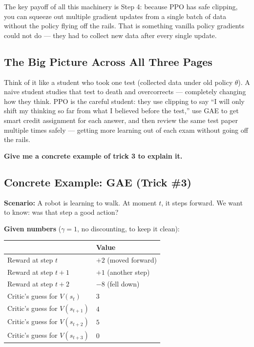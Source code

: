 The key payoff of all this machinery is Step 4: because PPO has safe clipping, you can squeeze out multiple gradient updates from a single batch of data without the policy flying off the rails. That is something vanilla policy gradients could not do --- they had to collect new data after every single update.

\subsection*{The Big Picture Across All Three Pages}

Think of it like a student who took one test (collected data under old policy $\theta$). A naive student studies that test to death and overcorrects --- completely changing how they think. PPO is the careful student: they use clipping to say ``I will only shift my thinking so far from what I believed before the test,'' use GAE to get smart credit assignment for each answer, and then review the same test paper multiple times safely --- getting more learning out of each exam without going off the rails.

\bigskip

\textbf{Give me a concrete example of trick 3 to explain it.}

\subsection*{Concrete Example: GAE (Trick \#3)}

\textbf{Scenario:} A robot is learning to walk. At moment $t$, it steps forward. We want to know: was that step a good action?

\textbf{Given numbers} ($\gamma = 1$, no discounting, to keep it clean):

\begin{center}
\begin{tabular}{ll}
\hline
 & Value \\
\hline
Reward at step $t$ & $+2$ (moved forward) \\
Reward at step $t+1$ & $+1$ (another step) \\
Reward at step $t+2$ & $-8$ (fell down) \\
Critic's guess for $V(s_t)$ & $3$ \\
Critic's guess for $V(s_{t+1})$ & $4$ \\
Critic's guess for $V(s_{t+2})$ & $5$ \\
Critic's guess for $V(s_{t+3})$ & $0$ \\
\hline
\end{tabular}
\end{center}

